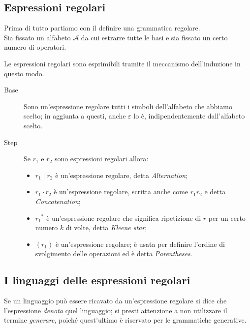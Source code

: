 \documentclass[class=book, crop=false, oneside, 12pt]{standalone}
\begin{document}
\subsection{Espressioni regolari}
Prima di tutto partiamo con il definire una grammatica regolare.\\
Sia fissato un alfabeto \(\mathcal{A}\) da cui estrarre tutte le basi e sia fissato un certo numero di operatori.

Le espressioni regolari sono esprimibili tramite il meccanismo dell'induzione in questo modo.
\begin{description}
    \item[Base] Sono un'espressione regolare tutti i simboli dell’alfabeto che abbiamo scelto; in aggiunta a questi, anche \(\varepsilon\) lo è, indipendentemente dall'alfabeto scelto.
    \item[Step] Se \(r_1\) e \(r_2\) sono espressioni regolari allora:
    \begin{itemize}
        \item \(r_1 \mid r_2\) è un’espressione regolare, detta \emph{Alternation};
        \item \(r_1 \cdot r_2\) è un’espressione regolare, scritta anche come \(r_1 r_2\) e detta \emph{Concatenation};
        \item \(r_1\)\(^\ast\) è un’espressione regolare che significa ripetizione di \(r\) per un certo numero \(k\) di volte, detta \emph{Kleene star};
        \item \((r_1)\) è un’espressione regolare; è usata per definire l’ordine di svolgimento delle operazioni ed è detta \emph{Parentheses}.
    \end{itemize} 
\end{description}

\subsection{I linguaggi delle espressioni regolari}
Se un linguaggio può essere ricavato da un'espressione regolare si dice che l'espressione \emph{denota} quel linguaggio; si presti attenzione a non utilizzare il termine \emph{generare}, poiché quest'ultimo è riservato per le grammatiche generative.
\end{document}

